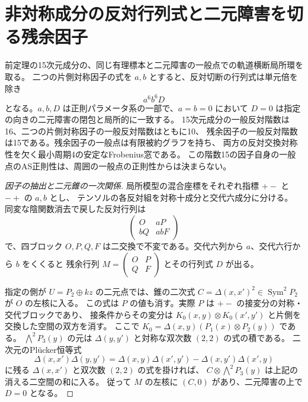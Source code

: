 \section{非対称成分の反対行列式と二元障害を切る残余因子}
\label{sec:binary-opposite-determinant}
\begin{theorem}\label{thm:binary-opposite-determinant}
前定理の15次元成分の、同じ有理標本と二元障害の一般点での軌道横断局所環を取る。
二つの片側対称因子の式を $a,b$ とすると、反対切断の行列式は単元倍を除き
\[
                         a^6b^6 D
\]
となる。$a,b,D$ は正則パラメータ系の一部で、$a=b=0$ において
$D=0$ は指定の向きの二元障害の閉包と局所的に一致する。
15次元成分の一般反対階数は16、二つの片側対称因子の一般反対階数はともに10、
残余因子の一般反対階数は15である。残余因子の一般点は有限被約グラフを持ち、
両方の反対交換対称性を欠く最小周期4の安定なFrobenius窓である。
この階数15の因子自身の一般点のAS正則性は、周囲の一般点の正則性からは決まらない。
\end{theorem}
\begin{proof}[因子の抽出と二元錐の一次関係]
局所模型の混合座標をそれぞれ指標 $+-$ と $-+$ の $a,b$ とし、
テンソルの各反対組を対称十成分と交代六成分に分ける。
同変な陰関数消去で戻した反対行列は
\[
           \begin{pmatrix} O&aP\\ bQ&abF\end{pmatrix}
\]
で、四ブロック $O,P,Q,F$ は二交換で不変である。交代六列から $a$、交代六行から $b$ をくくると
残余行列 $M=\left(\begin{smallmatrix}O&P\\Q&F\end{smallmatrix}\right)$ とその行列式 $D$ が出る。

指定の側が $U=P_2\oplus kz$ の二元点では、錐の二次式
$C=\Delta(x,x')^2\in\operatorname{Sym}^2 P_2$ が $O$ の左核に入る。
この式は $P$ の値も消す。実際 $P$ は $+-$ の接変分の対称・交代ブロックであり、
接条件からその変分は $K_0(x,y)\otimes K_0(x',y')$ と片側を交換した空間の双方を消す。
ここで $K_0=\Delta(x,y)(P_1(x)\otimes P_2(y))$ である。
$\bigwedge^2 P_3(y)$ の元は $\Delta(y,y')$ と対称な双次数 $(2,2)$ の式の積である。
二次元のPlücker恒等式
\[
 \Delta(x,x')\Delta(y,y')
 =\Delta(x,y)\Delta(x',y')-\Delta(x,y')\Delta(x',y)
\]
に残る $\Delta(x,x')$ と双次数 $(2,2)$ の式を掛ければ、
$C\otimes\bigwedge^2P_3(y)$ は上記の消える二空間の和に入る。
従って $M$ の左核に $(C,0)$ があり、二元障害の上で $D=0$ となる。
\end{proof}
